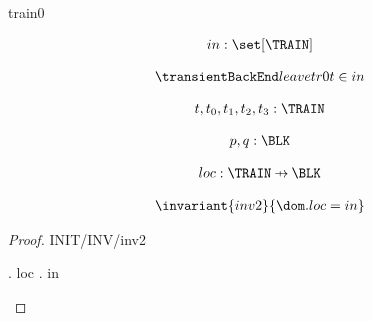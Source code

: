 \documentclass[12pt]{amsart}
\title{}
\author{}
\date{} %
\begin{document}
\maketitle
\tableofcontents


\begin{machine}{train0}

\newset{\TRAIN}
\newset{\BLK}
\newset{\LOC}

%
	\begin{align*}
\variable{		in : \set[\TRAIN]}
	\end{align*}
%



\begin{align*}
\transientB{leave}{tr0}{ \index{t}{t' = t} }
{	t \in in}
\end{align*}

\begin{align*}
\dummy{	t,t_0,t_1,t_2,t_3 : \TRAIN}
\end{align*}

\begin{align*}
\dummy{	p,q : \BLK}
\end{align*}


\begin{align*}
\variable{	loc : \TRAIN \pfun \BLK}
\end{align*}

\begin{align*}
\invariant{inv2}
{	\dom . loc = in }
\end{align*}

\begin{proof}{INIT/INV/inv2}
	\begin{calculation}
		\dom. loc
	\hint{=}{ \ref{in1} }
		  \bunion \dom . \emptyfun
	\hint{=}{ \ref{in0} }
		in
	\end{calculation}
\end{proof}


\end{machine}
\end{document}
